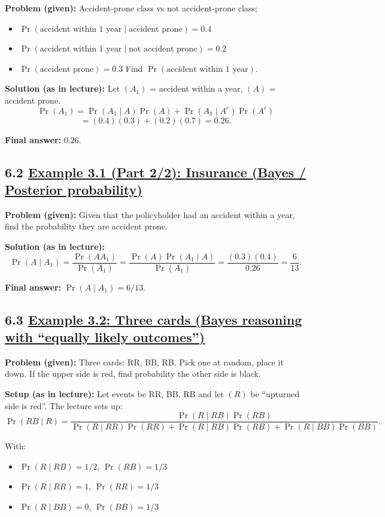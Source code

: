 \documentclass[11pt]{article}
\begin{document}
\textbf{Problem (given):} Accident-prone class vs not accident-prone class;

\begin{itemize}
\item $\Pr(\text{accident within 1 year} \mid \text{accident prone})=0.4$
\item $\Pr(\text{accident within 1 year} \mid \text{not accident prone})=0.2$
\item $\Pr(\text{accident prone})=0.3$
Find $\Pr(\text{accident within 1 year})$.
\end{itemize}

\textbf{Solution (as in lecture):} Let $(A_1)$ = accident within a year, $(A)$ = accident prone.
\[
\Pr(A_1)=\Pr(A_1\mid A)\Pr(A)+\Pr(A_1\mid A^c)\Pr(A^c)
\]
\[
=(0.4)(0.3)+(0.2)(0.7)=0.26.
\]

\textbf{Final answer:} $\boxed{0.26}$.

\vspace{0.5cm}
\subsection*{6.2 \underline{Example 3.1 (Part 2/2): Insurance (Bayes / Posterior probability)}}

\textbf{Problem (given):} Given that the policyholder had an accident within a year, find the probability they are accident prone.

\textbf{Solution (as in lecture):}
\[
\Pr(A\mid A_1)=\frac{\Pr(AA_1)}{\Pr(A_1)}
=\frac{\Pr(A)\Pr(A_1\mid A)}{\Pr(A_1)}
=\frac{(0.3)(0.4)}{0.26}=\frac{6}{13}.
\]

\textbf{Final answer:} $\boxed{\Pr(A\mid A_1)=6/13}$.

\vspace{0.5cm}
\subsection*{6.3 \underline{Example 3.2: Three cards (Bayes reasoning with “equally likely outcomes”)}}

\textbf{Problem (given):} Three cards: RR, BB, RB. Pick one at random, place it down. If the upper side is red, find probability the other side is black.

\textbf{Setup (as in lecture):} Let events be RR, BB, RB and let $(R)$ be “upturned side is red”. The lecture sets up:
\[
\Pr(RB\mid R)=\frac{\Pr(R\mid RB)\Pr(RB)}{\Pr(R\mid RR)\Pr(RR)+\Pr(R\mid RB)\Pr(RB)+\Pr(R\mid BB)\Pr(BB)}.
\]

With:
\begin{itemize}
\item $\Pr(R\mid RB)=1/2$, $\Pr(RB)=1/3$
\item $\Pr(R\mid RR)=1$, $\Pr(RR)=1/3$
\item $\Pr(R\mid BB)=0$, $\Pr(BB)=1/3$
\end{itemize}
\end{document}
